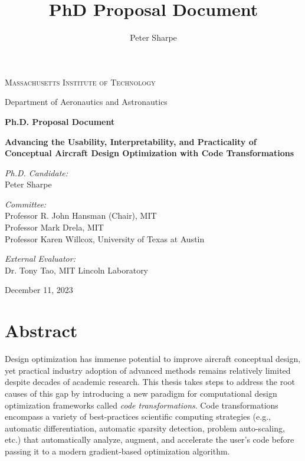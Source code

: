\documentclass[12pt,vi,oneside,table]{report}
\title{PhD Proposal Document}
\author{Peter Sharpe}
\begin{document}
    \begin{center}

        \vspace*{1cm}

        \textsc{Massachusetts Institute of Technology}

        Department of Aeronautics and Astronautics

        \vspace{1cm}

        \textbf{Ph.D. Proposal Document}

        \vspace{1cm}

        \textbf{\large Advancing the Usability, Interpretability, and Practicality of Conceptual Aircraft Design Optimization with Code Transformations}
        \vspace{1cm}

        \textit{Ph.D. Candidate:}\\
        Peter Sharpe

        \vspace{1cm}

        \textit{Committee:}\\
        Professor R. John Hansman (Chair), MIT\\
        Professor Mark Drela, MIT\\
        Professor Karen Willcox, University of Texas at Austin\\

        \vspace{1cm}

        \textit{External Evaluator:}\\
        Dr. Tony Tao, MIT Lincoln Laboratory

        \vspace{3cm}

        December 11, 2023

    \end{center}

    \chapter*{Abstract}

    Design optimization has immense potential to improve aircraft conceptual design, yet practical industry adoption of advanced methods remains relatively limited despite decades of academic research. This thesis takes steps to address the root causes of this gap by introducing a new paradigm for computational design optimization frameworks called \textit{code transformations}. Code transformations encompass a variety of best-practices scientific computing strategies (e.g., automatic differentiation, automatic sparsity detection, problem auto-scaling, etc.) that automatically analyze, augment, and accelerate the user's code before passing it to a modern gradient-based optimization algorithm.
\end{document}
